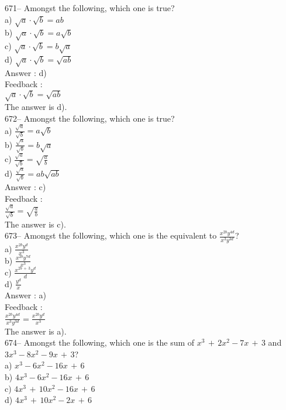 \documentclass[letterpaper, 12pt]{article}
\begin{document}
671-- Amongst the following, which one is true?\\
a) $\sqrt{a}\cdot\sqrt{b}=ab$\\
b) $\sqrt{a}\cdot\sqrt{b}=a\sqrt{b}$\\
c) $\sqrt{a}\cdot\sqrt{b}=b\sqrt{a}$\\
d) $\sqrt{a}\cdot\sqrt{b}=\sqrt{ab}$\\

Answer : d)\\

Feedback : \\
$\sqrt{a}\cdot\sqrt{b}=\sqrt{ab}$\\
The answer is d).\\

672-- Amongst the following, which one is true?\\
a) $\frac{\sqrt{a}}{\sqrt{b}}=a\sqrt{b}$\\[2mm]
b) $\frac{\sqrt{a}}{\sqrt{b}}=b\sqrt{a}$\\[2mm]
c) $\frac{\sqrt{a}}{\sqrt{b}}=\sqrt{\frac{a}{b}}$\\[2mm]
d) $\frac{\sqrt{a}}{\sqrt{b}}=ab\sqrt{ab}$\\

Answer : c)\\

Feedback : \\[2mm]
$\frac{\sqrt{a}}{\sqrt{b}}=\sqrt{\frac{a}{b}}$\\[2mm]
The answer is c).\\

673-- Amongst the following, which one is the equivalent to
$\frac{x^{2b}y^{4d}}{x^{3}y^{3d}}$?\\
a) $\frac{x^{2b}y^{d}}{x^{3}}$\\[2mm]
b) $\frac{x^{2b}y^{7d}}{x^{3}}$\\[2mm]
c) $\frac{x^{2b\,+\,3}y^{d}}{d}$\\[2mm]
d) $\frac{y^{d}}{x}$\\

Answer : a)\\

Feedback : \\[2mm]
$\frac{x^{2b}y^{4d}}{x^{3}y^{3d}}=\frac{x^{2b}y^{d}}{x^{3}}$\\[2mm]
The answer is a).\\


674-- Amongst the following, which one is the sum of
$x^{3}\,+\,2x^{2}-7x\,+\,3$ and $3x^{3}-8x^{2}-9x\,+\,3$?\\
a) $x^{3}-6x^{2}-16x\,+\,6$\\
b) $4x^{3}-6x^{2}-16x\,+\,6$\\
c) $4x^{3}\,+\,10x^{2}-16x\,+\,6$\\
d) $4x^{3}\,+\,10x^{2}-2x\,+\,6$\\
\end{document}
